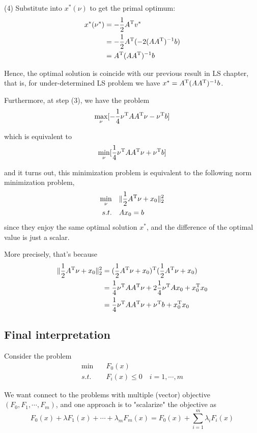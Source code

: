 \begin{example}
	(4) Substitute into $x^*(\nu)$ to get the primal optimum:
	\begin{align*}
	x^*(\nu^*) 
	&=-\frac{1}{2} A^{{\rm T}} v^* \\
	&= -\frac{1}{2}A^{{\rm T}}(-2(AA^{{\rm T}})^{-1}b)\\
	&= A^{{\rm T}}(AA^{{\rm T}})^{-1}b
	\end{align*}

Hence, the optimal solution is coincide with our previous result in LS chapter, that is, for under-determined LS problem we have $x^* = A^{{\rm T}}(AA^{{\rm T}})^{-1}b$.

Furthermore, at step (3), we have the problem
$$\max_{\nu} [- \frac{1}{4}\nu^{{\rm T}}AA^{{\rm T}}\nu - \nu^{{\rm T}}b ]$$

which is equivalent to 
$$\min_{\nu} [\frac{1}{4}\nu^{{\rm T}}AA^{{\rm T}}\nu + \nu^{{\rm T}}b ]$$

and it turns out, this minimization problem is equivalent to the following norm minimization problem,
\begin{align*}
\min_\nu\quad & \Vert\frac{1}{2}A^{{\rm T}}\nu + x_0\Vert^2_2\\
s.t.\quad & Ax_0 = b 
\end{align*}
since they enjoy the same optimal solution $x^*$, and the difference of the optimal value is just a scalar.

More precisely, that's because
\begin{align*}
	\Vert \frac{1}{2}A^{{\rm T}}\nu + x_0\Vert_2^2 
	&= (\frac{1}{2}A^{{\rm T}}\nu+x_0)^{{\rm T}}(\frac{1}{2}A^{{\rm T}}\nu+x_0)\\
	&= \frac{1}{4}\nu^{{\rm T}}AA^{{\rm T}}\nu + 2\frac{1}{4}\nu^{{\rm T}}Ax_0 + x_0^{{\rm T}}x_0\\
	&= \frac{1}{4}\nu^{{\rm T}}AA^{{\rm T}}\nu + \nu^{{\rm T}}b+x_0^{{\rm T}}x_0
\end{align*}

\end{example}


\subsection{Final interpretation}
Consider the problem
\begin{align*}
	\min \quad & F_0(x)\\
	s.t. \quad & F_i(x)\leq 0\quad i = 1,\cdots,m
\end{align*}

We want connect to the problems with multiple (vector) objective $(F_0,F_1,\cdots,F_m)$, and one approach is to "scalarize" the objective as 
\begin{equation*}
	F_0(x) + \lambda F_1(x) + \cdots + \lambda_mF_m(x) = F_0(x) + \sum^m_{i=1}\lambda_iF_i(x)
\end{equation*}

